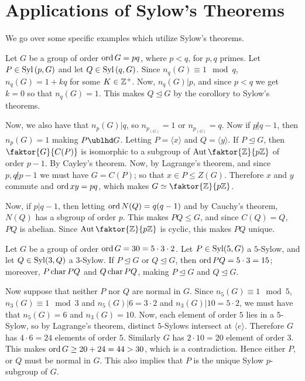 \section{Applications of Sylow's Theorems}
\label{section_4.6}

We go over some specific examples which utilize Sylow's theorems.

\begin{example}\label{example_4.14}
  Let $G$ be a group of order $\operatorname{ord}{G}=pq$, where $p<q$, for  $p,q$ primes.
  Let  $P \in \operatorname{Syl}{(p,G)}$ and let $Q \in \operatorname{Syl}{(q,G)}$. Since $n_q(G) \equiv 1
  \mod{q}$, $n_q(G)=1+kq$ for some $K \in \mathbb{Z}^+$. Now,  $n_q(G)|p$, and since
  $p<q$ we get  $k=0$ so that  $n_q(G)=1$. This makes $Q \unlhd G$ by the
  corollory to Sylow's theorems.

  Now, we also have that  $n_p(G)|q$, so $n_p_(G)=1$ or $n_p_(G)=q$. Now if $p
  \not| q-1$, then  $n_p(G)=1$ making $P \ublhd G$. Letting  $P=\langle x
  \rangle$ and $Q=\langle y \rangle$. If $P \unlhd G$, then
  $\faktor{G}{C(P)}$ is isomorphic to a subgroup of $\Aut{\faktor{\Z}{p\Z}}$
  of order $p-1$. By Cayley's theorem. Now, by Lagrange's theorem, and since
  $p,q \not| p-1$ we must have  $G=C(P)$; so that $x \in P \leq Z(G)$.
  Therefore $x$ and $y$ commute and  $\operatorname{ord}{xy}=pq$, which makes $G \simeq
  \faktor{\Z}{p\Z}$.

  Now, if $p|q-1$, then letting $\operatorname{ord}{N(Q)}=q(q-1)$ and by Cauchy's theorem,
  $N(Q)$ has a sbgroup of order $p$. This makes $PQ \leq G$, and since
  $C(Q)=Q$, $PQ$ is abelian. Since  $\Aut{\faktor{\Z}{p\Z}}$ is cyclic, this
  makes $PQ$ unique.
\end{example}

\begin{example}\label{example_4.15}
  Let $G$ be a group of order  $\operatorname{ord}{G}=30=5 \cdot 3 \cdot 2$. Let $P \in
  \operatorname{Syl}(5,G)$ a $5$-Sylow, and let  $Q \in \operatorname{Syl}(3,Q)$ a $3$-Sylow. If  $P
  \unlhd G$ or  $Q \unlhd G$, then  $\operatorname{ord}{PQ}=5 \cdot 3=15$; moreover, $P
  \operatorname{char}{PQ}$ and $Q \operatorname{char}{PQ}$, making $P \unlhd G$ and  $Q \unlhd G$.

  Now suppose that neither $P$ nor $Q$ are normal in $G$. Since $n_5(G) \equiv
  1 \mod{5}$, $n_3(G) \equiv 1 \mod{3}$ and $n_5(G)|6=3 \cdot 2$ and
  $n_3(G)|10=5 \cdot 2$, we must have that $n_5(G)=6$ and $n_3(G)=10$. Now,
  each element of order $5$ lies in a $5$-Sylow, so by Lagrange's theorem,
  distinct $5$-Sylows intersect at  $\langle e \rangle$. Therefore $G$ has $4
  \cdot 6=24$ elements of order $5$. Similarly $G$ has $2 \cdot 10=20$ element
  of order $3$. This makes $\operatorname{ord}{G} \geq 20+24=44>30$, which is a contradiction.
  Hence either $P$, or  $Q$ must be normal in $G$. This also implies that $P$
  is the unique Sylow $p$-subgroup of $G$.
\end{example}

